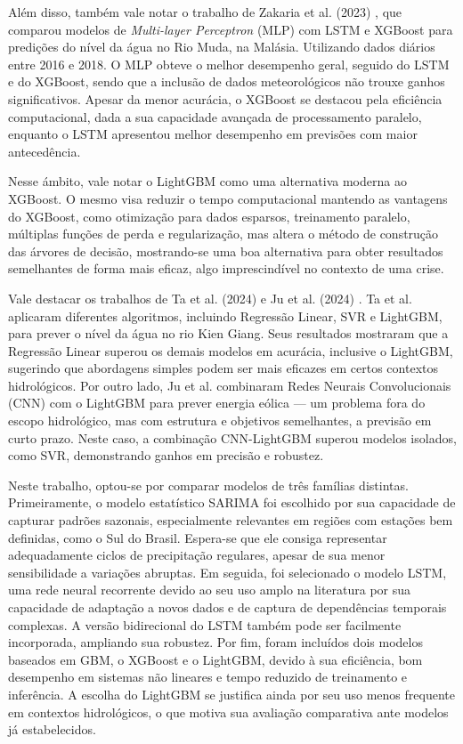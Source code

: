 Além disso, também vale notar o trabalho de Zakaria et al. (2023) \cite{zakaria}, que comparou modelos de
\textit{Multi-layer Per­ceptron} (MLP) com LSTM e XGBoost para predições do nível da água no Rio Muda, na Malásia.
Utilizando dados diários entre 2016 e 2018. O MLP obteve o melhor desempenho geral, seguido do LSTM e do XGBoost, sendo
que a inclusão de dados meteorológicos não trouxe ganhos significativos. Apesar da menor acurácia, o XGBoost se destacou
pela eficiência computacional, dada a sua capacidade avançada de processamento paralelo, enquanto o LSTM apresentou
melhor desempenho em previsões com maior antecedência.

Nesse ámbito, vale notar o LightGBM como uma alternativa moderna ao XGBoost. O mesmo visa reduzir o tempo computacional
mantendo as vantagens do XGBoost, como otimização para dados esparsos, treinamento paralelo, múltiplas funções de perda
e regularização, mas altera o método de construção das árvores de decisão, mostrando-se uma boa alternativa para obter
resultados semelhantes de forma mais eficaz, algo imprescindível no contexto de uma crise.

Vale destacar os trabalhos de Ta et al. (2024) \cite{ta} e Ju et al. (2024) \cite{ju}. Ta et al. aplicaram diferentes
algoritmos, incluindo Regressão Linear, SVR e LightGBM, para prever o nível da água no rio Kien Giang. Seus resultados
mostraram que a Regressão Linear superou os demais modelos em acurácia, inclusive o LightGBM, sugerindo que abordagens
simples podem ser mais eficazes em certos contextos hidrológicos. Por outro lado, Ju et al. combinaram Redes Neurais
Convolucionais (CNN) com o LightGBM para prever energia eólica — um problema fora do escopo hidrológico, mas com
estrutura e objetivos semelhantes, a previsão em curto prazo. Neste caso, a combinação CNN-LightGBM superou modelos
isolados, como SVR, demonstrando ganhos em precisão e robustez.

Neste trabalho, optou-se por comparar modelos de três famílias distintas. Primeiramente, o modelo estatístico SARIMA foi
escolhido por sua capacidade de capturar padrões sazonais, especialmente relevantes em regiões com estações bem
definidas, como o Sul do Brasil. Espera-se que ele consiga representar adequadamente ciclos de precipitação regulares,
apesar de sua menor sensibilidade a variações abruptas. Em seguida, foi selecionado o modelo LSTM, uma rede neural
recorrente devido ao seu uso amplo na literatura por sua capacidade de adaptação a novos dados e de captura de
dependências temporais complexas. A versão bidirecional do LSTM também pode ser facilmente incorporada, ampliando sua
robustez. Por fim, foram incluídos dois modelos baseados em GBM, o XGBoost e o LightGBM, devido à sua eficiência, bom
desempenho em sistemas não lineares e tempo reduzido de treinamento e inferência. A escolha do LightGBM se justifica
ainda por seu uso menos frequente em contextos hidrológicos, o que motiva sua avaliação comparativa ante modelos já
estabelecidos.

